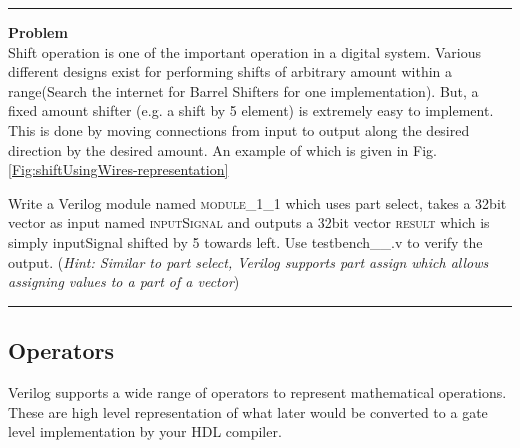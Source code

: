 \documentclass[a4paper,10pt]{article}
\newcommand{\ano}{\text{1}}
\theoremstyle{mytheor}
\newcounter{problemNumber}
\newcommand {
  \insertProblem}[1]{
  \vspace{0.5cm}
  \hrule
  \vspace{0.3cm}

  {\color{greatblue}\textbf{\large{Problem \theproblemNumber}}}
  \vspace{2pt}\\#1

  \addtocounter{problemNumber}{1}
  \vspace{0.2cm}
  \hrule  
  \vspace{0.5cm}
}
\begin{document}
\insertProblem{ Shift operation is one of the important operation in a
  digital system. Various different designs exist for performing
  shifts of arbitrary amount within a range(Search the internet for
  Barrel Shifters for one implementation). But, a fixed amount shifter
  (e.g. a shift by 5 element) is extremely easy to implement. This is
  done by moving connections from input to output along the desired
  direction by the desired amount. An example of which is given in
  Fig. \ref{Fig:shiftUsingWires-representation}

  Write a Verilog module named \textsc{module\_1\_1} which uses part
  select, takes a 32bit vector as input named \textsc{inputSignal} and
  outputs a 32bit vector \textsc{result} which is simply inputSignal
  shifted by 5 towards left. Use
  {testbench\_{\ano}\_{\theproblemNumber}.v} to verify the
  output. (\textit{Hint: Similar to part select, Verilog supports part
    assign which allows assigning values to a part of a vector})}
%

\subsection*{Operators}
Verilog supports a wide range of operators to represent mathematical
operations. These are high level representation of what later would be
converted to a gate level implementation by your HDL compiler.
\end{document}
